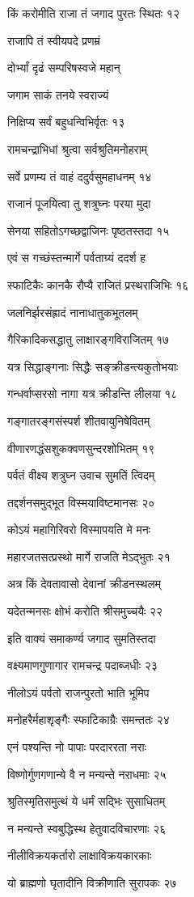 किं करोमीति राजा तं जगाद पुरतः स्थितः १२

राजापि तं स्वीयपदे प्रणम्रं

दोर्भ्यां दृढं सम्परिषस्वजे महान्

जगाम साकं तनये स्वराज्यं

निक्षिप्य सर्वं बहुधन्विभिर्वृतः १३

रामचन्द्राभिधां श्रुत्वा सर्वश्रुतिमनोहराम्

सर्वे प्रणम्य तं वाहं ददुर्वसुमहाधनम् १४

राजानं पूजयित्वा तु शत्रुघ्नः परया मुदा

सेनया सहितोऽगच्छद्वाजिनः पृष्ठतस्तदा १५

एवं स गच्छंस्तन्मार्गे पर्वताग्र्यं ददर्श ह

स्फाटिकैः कानकै रौप्यै राजितं प्रस्थराजिभिः १६

जलनिर्झरसंह्रादं नानाधातुकभूतलम्

गैरिकादिकसद्धातु लाक्षारङ्गविराजितम् १७

यत्र सिद्धाङ्गनाः सिद्धैः सङ्क्रीडन्त्यकुतोभयाः

गन्धर्वाप्सरसो नागा यत्र क्रीडन्ति लीलया १८

गङ्गातरङ्गसंस्पर्श शीतवायुनिषेवितम्

वीणारणद्धंसशुकक्वणसुन्दरशोभितम् १९

पर्वतं वीक्ष्य शत्रुघ्न उवाच सुमतिं त्विदम्

तद्दर्शनसमुद्भूत विस्मयाविष्टमानसः २०

कोऽयं महागिरिवरो विस्मापयति मे मनः

महारजतसत्प्रस्थो मार्गे राजति मेऽद्भुतः २१

अत्र किं देवतावासो देवानां क्रीडनस्थलम्

यदेतन्मनसः क्षोभं करोति श्रीसमुच्चयैः २२

इति वाक्यं समाकर्ण्य जगाद सुमतिस्तदा

वक्ष्यमाणगुणागार रामचन्द्र पदाब्जधीः २३

नीलोऽयं पर्वतो राजन्पुरतो भाति भूमिप

मनोहरैर्महाशृङ्गैः स्फाटिकाग्रैः समन्ततः २४

एनं पश्यन्ति नो पापाः परदाररता नराः

विष्णोर्गुणगणान्ये वै न मन्यन्ते नराधमाः २५

श्रुतिस्मृतिसमुत्थं ये धर्मं सद्भिः सुसाधितम्

न मन्यन्ते स्वबुद्धिस्थ हेतुवादविचारणाः २६

नीलीविक्रयकर्तारो लाक्षाविक्रयकारकाः

यो ब्राह्मणो घृतादीनि विक्रीणाति सुरापकः २७

